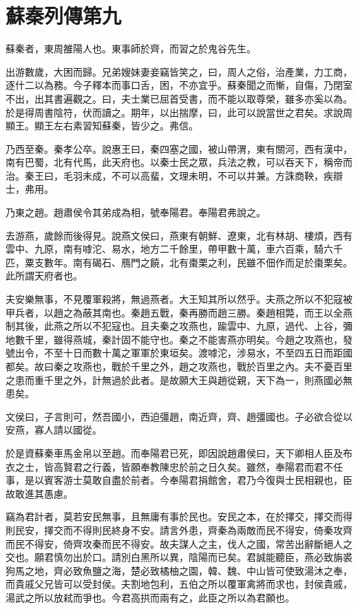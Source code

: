 \chapter{蘇秦列傳第九}

蘇秦者，東周雒陽人也。東事師於齊，而習之於鬼谷先生。

出游數歲，大困而歸。兄弟嫂妹妻妾竊皆笑之，曰，周人之俗，治產業，力工商，逐什二以為務。今子釋本而事口舌，困，不亦宜乎。蘇秦聞之而慚，自傷，乃閉室不出，出其書遍觀之。曰，夫士業已屈首受書，而不能以取尊榮，雖多亦奚以為。於是得周書陰符，伏而讀之。期年，以出揣摩，曰，此可以說當世之君矣。求說周顯王。顯王左右素習知蘇秦，皆少之。弗信。

乃西至秦。秦孝公卒。說惠王曰，秦四塞之國，被山帶渭，東有關河，西有漢中，南有巴蜀，北有代馬，此天府也。以秦士民之眾，兵法之教，可以吞天下，稱帝而治。秦王曰，毛羽未成，不可以高蜚，文理未明，不可以并兼。方誅商鞅，疾辯士，弗用。

乃東之趙。趙肅侯令其弟成為相，號奉陽君。奉陽君弗說之。

去游燕，歲餘而後得見。說燕文侯曰，燕東有朝鮮、遼東，北有林胡、樓煩，西有雲中、九原，南有嘑沱、易水，地方二千餘里，帶甲數十萬，車六百乘，騎六千匹，粟支數年。南有碣石、鴈門之饒，北有棗栗之利，民雖不佃作而足於棗栗矣。此所謂天府者也。

夫安樂無事，不見覆軍殺將，無過燕者。大王知其所以然乎。夫燕之所以不犯寇被甲兵者，以趙之為蔽其南也。秦趙五戰，秦再勝而趙三勝。秦趙相斃，而王以全燕制其後，此燕之所以不犯寇也。且夫秦之攻燕也，踰雲中、九原，過代、上谷，彌地數千里，雖得燕城，秦計固不能守也。秦之不能害燕亦明矣。今趙之攻燕也，發號出令，不至十日而數十萬之軍軍於東垣矣。渡嘑沱，涉易水，不至四五日而距國都矣。故曰秦之攻燕也，戰於千里之外，趙之攻燕也，戰於百里之內。夫不憂百里之患而重千里之外，計無過於此者。是故願大王與趙從親，天下為一，則燕國必無患矣。

文侯曰，子言則可，然吾國小，西迫彊趙，南近齊，齊、趙彊國也。子必欲合從以安燕，寡人請以國從。

於是資蘇秦車馬金帛以至趙。而奉陽君已死，即因說趙肅侯曰，天下卿相人臣及布衣之士，皆高賢君之行義，皆願奉教陳忠於前之日久矣。雖然，奉陽君而君不任事，是以賓客游士莫敢自盡於前者。今奉陽君捐館舍，君乃今復與士民相親也，臣故敢進其愚慮。

竊為君計者，莫若安民無事，且無庸有事於民也。安民之本，在於擇交，擇交而得則民安，擇交而不得則民終身不安。請言外患，齊秦為兩敵而民不得安，倚秦攻齊而民不得安，倚齊攻秦而民不得安。故夫謀人之主，伐人之國，常苦出辭斷絕人之交也。願君慎勿出於口。請別白黑所以異，陰陽而已矣。君誠能聽臣，燕必致旃裘狗馬之地，齊必致魚鹽之海，楚必致橘柚之園，韓、魏、中山皆可使致湯沐之奉，而貴戚父兄皆可以受封侯。夫割地包利，五伯之所以覆軍禽將而求也，封侯貴戚，湯武之所以放弒而爭也。今君高拱而兩有之，此臣之所以為君願也。

